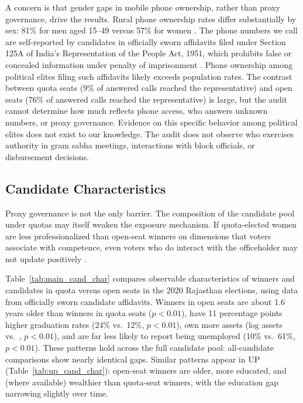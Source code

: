 \documentclass[12pt]{article}
\begin{document}
A concern is that gender gaps in mobile phone ownership, rather than proxy governance, drive the results. Rural phone ownership rates differ substantially by sex: 81\% for men aged 15--49 versus 57\% for women \citep[Fig.~2.2, p.~7]{mospi2025mobile}. The phone numbers we call are self-reported by candidates in officially sworn affidavits filed under Section 125A of India's Representation of the People Act, 1951, which prohibits false or concealed information under penalty of imprisonment \citep[p.~52]{india_rpa_1951}. Phone ownership among political elites filing such affidavits likely exceeds population rates. The contrast between quota seats (9\% of answered calls reached the representative) and open seats (76\% of answered calls reached the representative) is large, but the audit cannot determine how much reflects phone access, who answers unknown numbers, or proxy governance. Evidence on this specific behavior among political elites does not exist to our knowledge. The audit does not observe who exercises authority in gram sabha meetings, interactions with block officials, or disbursement decisions.

\subsection{Candidate Characteristics}\label{sec:cand_char}

Proxy governance is not the only barrier. The composition of the candidate pool under quotas may itself weaken the exposure mechanism. If quota-elected women are less professionalized than open-seat winners on dimensions that voters associate with competence, even voters who do interact with the officeholder may not update positively \citep{hansen1997talking, atkeson2003not, weeks2015quotas}.

Table~\ref{tab:main_cand_char} compares observable characteristics of winners and candidates in quota versus open seats in the 2020 Rajasthan elections, using data from officially sworn candidate affidavits. Winners in open seats are about 1.6 years older than winners in quota seats ($p < 0.01$), have 11 percentage points higher graduation rates (24\% vs.\ 12\%, $p < 0.01$), own more assets (log assets \allLogassetsOpen{} vs.\ \allLogassetsQuota{}, $p < 0.01$), and are far less likely to report being unemployed (10\% vs.\ 61\%, $p < 0.01$). These patterns hold across the full candidate pool: all-candidate comparisons show nearly identical gaps. Similar patterns appear in UP (Table~\ref{tab:up_cand_char}): open-seat winners are older, more educated, and (where available) wealthier than quota-seat winners, with the education gap narrowing slightly over time.
\end{document}
